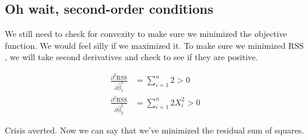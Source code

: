 \documentclass[12pt]{exam}
\begin{document}
\subsection*{Oh wait, second-order conditions}

\noindent We still need to check for convexity to make sure we minimized the objective function. We would feel silly if we maximized it. To make sure we minimized $\text{RSS}$, we will take second derivatives and check to see if they are positive.

\begin{align}
\frac{\partial^2 \text{RSS}}{\partial \hat{\beta}_1^2} &= \sum_{i=1}^n 2 > 0 \label{soc1} \\ 
\frac{\partial^2 \text{RSS}}{\partial \hat{\beta}_2^2} &= \sum_{i=1}^n 2X_i^2  > 0 \label{soc2}
\end{align}

\noindent Crisis averted. Now we can say that we've minimized the residual sum of squares.
\end{document}
